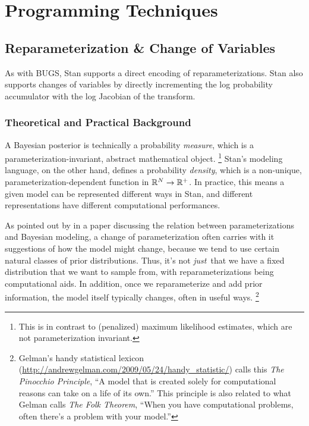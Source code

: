 \part{Programming Techniques}\label{programming-techniques.part}


\chapter{Reparameterization \& Change of Variables}%
\label{change-of-variables.chapter}

\noindent
As with BUGS, Stan supports a direct encoding of reparameterizations.
Stan also supports changes of variables by directly incrementing the
log probability accumulator with the log Jacobian of the transform.

\section{Theoretical and Practical Background}

A Bayesian posterior is technically a probability \emph{measure},
which is a parameterization-invariant, abstract mathematical object.%
%
\footnote{This is in contrast to (penalized) maximum likelihood
  estimates, which are not parameterization invariant.}
%
Stan's modeling language, on the other hand, defines a probability
\emph{density}, which is a non-unique, parameterization-dependent
function in $\mathbb{R}^N \rightarrow \mathbb{R}^{+}$.  In practice, this
means a given model can be represented different ways in Stan, and
different representations have different computational performances.

As pointed out by \cite{Gelman:2004} in a paper discussing the
relation between parameterizations and Bayesian modeling, a change of
parameterization often carries with it suggestions of how the model
might change, because we tend to use certain natural classes of prior
distributions.  Thus, it's not \emph{just}\ that we have a fixed
distribution that we want to sample from, with reparameterizations
being computational aids.  In addition, once we reparameterize and add
prior information, the model itself typically changes, often in useful
ways.%
%
\footnote{Gelman's handy statistical lexicon
  (\url{http://andrewgelman.com/2009/05/24/handy_statistic/}) calls
  this \emph{The Pinocchio Principle}, ``A model that is created
  solely for computational reasons can take on a life of its own.''
  This principle is also related to what Gelman calls \emph{The Folk
    Theorem}, ``When you have computational problems, often there's a
  problem with your model.''}




